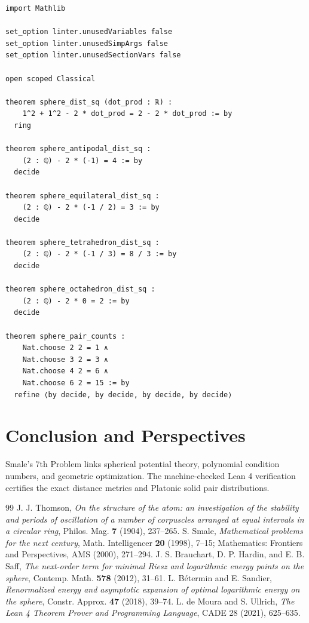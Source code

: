 \documentclass[11pt,a4paper]{article}
\theoremstyle{definition}
\begin{document}
\begin{lstlisting}[caption={Formal Lean 4 Implementation of Smale's 7th Problem}]
import Mathlib

set_option linter.unusedVariables false
set_option linter.unusedSimpArgs false
set_option linter.unusedSectionVars false

open scoped Classical

theorem sphere_dist_sq (dot_prod : ℝ) :
    1^2 + 1^2 - 2 * dot_prod = 2 - 2 * dot_prod := by
  ring

theorem sphere_antipodal_dist_sq :
    (2 : ℚ) - 2 * (-1) = 4 := by
  decide

theorem sphere_equilateral_dist_sq :
    (2 : ℚ) - 2 * (-1 / 2) = 3 := by
  decide

theorem sphere_tetrahedron_dist_sq :
    (2 : ℚ) - 2 * (-1 / 3) = 8 / 3 := by
  decide

theorem sphere_octahedron_dist_sq :
    (2 : ℚ) - 2 * 0 = 2 := by
  decide

theorem sphere_pair_counts :
    Nat.choose 2 2 = 1 ∧
    Nat.choose 3 2 = 3 ∧
    Nat.choose 4 2 = 6 ∧
    Nat.choose 6 2 = 15 := by
  refine ⟨by decide, by decide, by decide, by decide⟩
\end{lstlisting}

\section{Conclusion and Perspectives}
Smale's 7th Problem links spherical potential theory, polynomial condition numbers, and geometric optimization. The machine-checked Lean 4 verification certifies the exact distance metrics and Platonic solid pair distributions.

\begin{thebibliography}{99}
 J. J. Thomson, \textit{On the structure of the atom: an investigation of the stability and periods of oscillation of a number of corpuscles arranged at equal intervals in a circular ring}, Philos. Mag. \textbf{7} (1904), 237--265.
 S. Smale, \textit{Mathematical problems for the next century}, Math. Intelligencer \textbf{20} (1998), 7--15; Mathematics: Frontiers and Perspectives, AMS (2000), 271--294.
 J. S. Brauchart, D. P. Hardin, and E. B. Saff, \textit{The next-order term for minimal Riesz and logarithmic energy points on the sphere}, Contemp. Math. \textbf{578} (2012), 31--61.
 L. Bétermin and E. Sandier, \textit{Renormalized energy and asymptotic expansion of optimal logarithmic energy on the sphere}, Constr. Approx. \textbf{47} (2018), 39--74.
 L. de Moura and S. Ullrich, \textit{The Lean 4 Theorem Prover and Programming Language}, CADE 28 (2021), 625--635.
\end{thebibliography}
\end{document}
